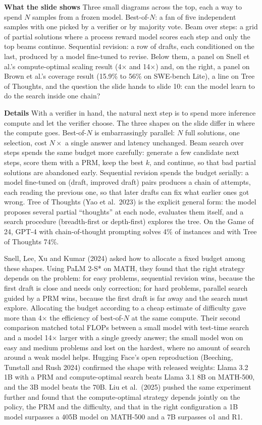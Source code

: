 \documentclass[11pt,letterpaper]{article}
\newcommand{\para}[1]{\medskip\noindent\textbf{#1}\quad}
\begin{document}
\para{What the slide shows} Three small diagrams across the top, each a way to spend $N$ samples from a frozen model. Best-of-$N$: a fan of five independent samples with one picked by a verifier or by majority vote. Beam over steps: a grid of partial solutions where a process reward model scores each step and only the top beams continue. Sequential revision: a row of drafts, each conditioned on the last, produced by a model fine-tuned to revise. Below them, a panel on Snell et al.'s compute-optimal scaling result (4$\times$ and 14$\times$) and, on the right, a panel on Brown et al.'s coverage result (15.9\% to 56\% on SWE-bench Lite), a line on Tree of Thoughts, and the question the slide hands to slide 10: can the model learn to do the search inside one chain?

\para{Details} With a verifier in hand, the natural next step is to spend more inference compute and let the verifier choose. The three shapes on the slide differ in where the compute goes. Best-of-$N$ is embarrassingly parallel: $N$ full solutions, one selection, cost $N\times$ a single answer and latency unchanged. Beam search over steps spends the same budget more carefully: generate a few candidate next steps, score them with a PRM, keep the best $k$, and continue, so that bad partial solutions are abandoned early. Sequential revision spends the budget serially: a model fine-tuned on (draft, improved draft) pairs produces a chain of attempts, each reading the previous one, so that later drafts can fix what earlier ones got wrong. Tree of Thoughts (Yao et al.\ 2023) is the explicit general form: the model proposes several partial ``thoughts'' at each node, evaluates them itself, and a search procedure (breadth-first or depth-first) explores the tree. On the Game of 24, GPT-4 with chain-of-thought prompting solves 4\% of instances and with Tree of Thoughts 74\%.

Snell, Lee, Xu and Kumar (2024) asked how to allocate a fixed budget among these shapes. Using PaLM 2-S* on MATH, they found that the right strategy depends on the problem: for easy problems, sequential revision wins, because the first draft is close and needs only correction; for hard problems, parallel search guided by a PRM wins, because the first draft is far away and the search must explore. Allocating the budget according to a cheap estimate of difficulty gave more than 4$\times$ the efficiency of best-of-$N$ at the same compute. Their second comparison matched total FLOPs between a small model with test-time search and a model 14$\times$ larger with a single greedy answer; the small model won on easy and medium problems and lost on the hardest, where no amount of search around a weak model helps. Hugging Face's open reproduction (Beeching, Tunstall and Rush 2024) confirmed the shape with released weights: Llama 3.2 1B with a PRM and compute-optimal search beats Llama 3.1 8B on MATH-500, and the 3B model beats the 70B. Liu et al.\ (2025) pushed the same experiment further and found that the compute-optimal strategy depends jointly on the policy, the PRM and the difficulty, and that in the right configuration a 1B model surpasses a 405B model on MATH-500 and a 7B surpasses o1 and R1.
\end{document}
